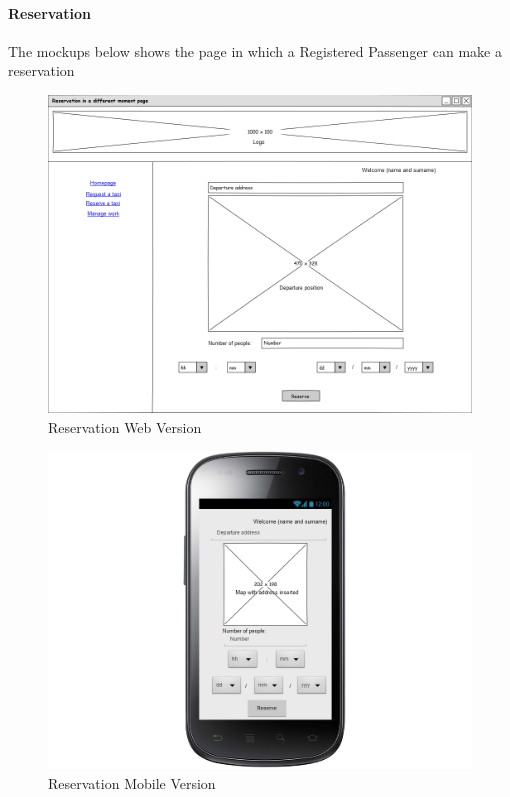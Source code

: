 \documentclass[a4paper,12pt]{article}%
\begin{document}
\paragraph{Reservation}
The mockups below shows the page in which a Registered Passenger can make a reservation
\begin{figure}[H]
\centering
\includegraphics[scale=0.35]{mockups/reservation_web.png}
\caption{Reservation Web Version}
\end{figure}
\begin{figure}[H]
\centering
\includegraphics[scale=0.35]{mockups/reservation_mobile.png}
\caption{Reservation Mobile Version}
\end{figure}
\break
\end{document}
